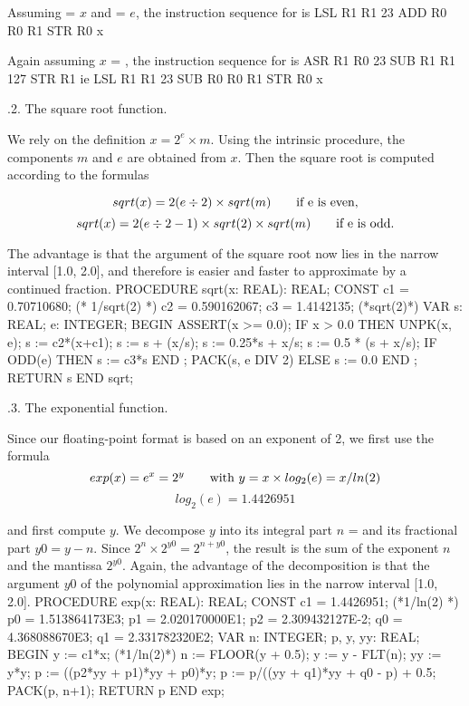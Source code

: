 \noindent Assuming  = $x$ and  = $e$, the instruction sequence for  is
\begintt
LSL R1 R1 23
ADD R0 R0 R1
STR R0 x
\endtt

\noindent Again assuming $x$ = , the instruction sequence for  is
\begintt
ASR R1 R0 23
SUB R1 R1 127
STR R1 ie
LSL R1 R1 23
SUB R0 R0 R1
STR R0 x
\endtt

.2. The square root function.

We rely on the definition $x = 2^e \times m$. Using the intrinsic  procedure, the components $m$ and $e$ are obtained from $x$. Then the square root is computed according to the formulas

$$sqrt(x) = 2(e \div 2) \times sqrt(m) \qquad\hbox{if e is even,}$$
$$sqrt(x) = 2(e \div 2 - 1) \times sqrt(2) \times sqrt(m) \qquad\hbox{if e is odd.}$$

The advantage is that the argument of the square root now lies in the narrow interval [1.0, 2.0], and therefore is easier and faster to approximate by a continued fraction.
\begintt
PROCEDURE sqrt(x: REAL): REAL;
  CONST c1 = 0.70710680; (* 1/sqrt(2) *)
    c2 = 0.590162067;
    c3 = 1.4142135; (*sqrt(2)*) VAR s: REAL; e: INTEGER;
BEGIN ASSERT(x >= 0.0);
  IF x > 0.0 THEN
  UNPK(x, e);
  s := c2*(x+c1);
  s := s + (x/s);
  s := 0.25*s + x/s;
  s := 0.5 * (s + x/s);
  IF ODD(e) THEN s := c3*s END ;
  PACK(s, e DIV 2)
  ELSE s := 0.0 END ; RETURN s
END sqrt;
\endtt

.3. The exponential function.

Since our floating-point format is based on an exponent of 2, we first use the formula
$$exp(x) = e^x = 2^y \qquad\hbox{with $y = x \times log_2(e) = x / ln(2)$}$$
$$log_2(e) = 1.4426951$$

and first compute $y$. We decompose $y$ into its integral part $n$ =  and its fractional part $y0 = y - n$. Since $2^n \times 2^{y0} = 2^{n+y0}$, the result is the sum of the exponent $n$ and the mantissa $2^{y0}$. Again, the advantage of the decomposition is that the argument $y0$ of the polynomial approximation lies in the narrow interval [1.0, 2.0].
\begintt
PROCEDURE exp(x: REAL): REAL;
  CONST c1 = 1.4426951; (*1/ln(2) *)
        p0 = 1.513864173E3;
        p1 = 2.020170000E1;
        p2 = 2.309432127E-2;
        q0 = 4.368088670E3;
        q1 = 2.331782320E2;
  VAR n: INTEGER; p, y, yy: REAL;
BEGIN
  y := c1*x; (*1/ln(2)*)
  n := FLOOR(y + 0.5);
  y := y - FLT(n);
  yy := y*y;
  p := ((p2*yy + p1)*yy + p0)*y;
  p := p/((yy + q1)*yy + q0 - p) + 0.5;
  PACK(p, n+1);
  RETURN p
END exp;
\endtt

